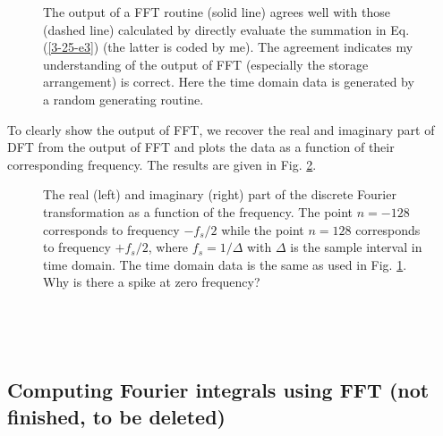 \documentclass{article}
\begin{document}
\begin{figure}[h]
  \caption{\label{3-25-e8}The output of a FFT routine (solid line) agrees well
  with those (dashed line) calculated by directly evaluate the summation in
  Eq. (\ref{3-25-e3}) (the latter is coded by me). The agreement indicates my
  understanding of the output of FFT (especially the storage arrangement) is
  correct. Here the time domain data is generated by a random generating
  routine. }
\end{figure}

To clearly show the output of FFT, we recover the real and imaginary part of
DFT from the output of FFT and plots the data as a function of their
corresponding frequency. The results are given in Fig. \ref{8-27-p1}.

\begin{figure}[h]
  \caption{\label{8-27-p1}The real (left) and imaginary (right) part of the
  discrete Fourier transformation as a function of the frequency. The point $n
  = - 128$ corresponds to frequency $- f_s / 2$ while the point $n = 128$
  corresponds to frequency $+ f_s / 2$, where $f_s = 1 / \Delta$ with $\Delta$
  is the sample interval in time domain. The time domain data is the same as
  used in Fig. \ref{3-25-e8}. Why is there a spike at zero frequency?}
\end{figure}

\

\

\subsection{Computing Fourier integrals using FFT (not finished, to be
deleted)}
\end{document}
